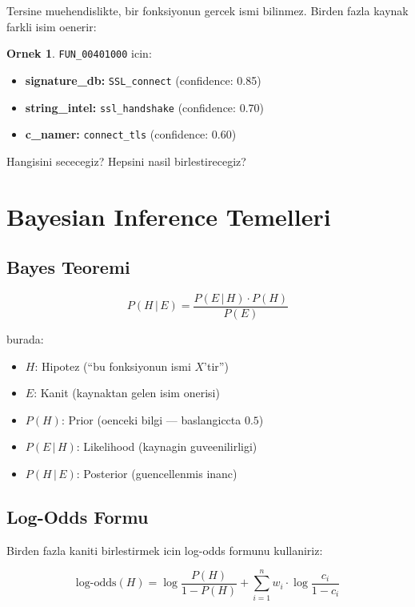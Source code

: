 \documentclass[12pt,a4paper,oneside]{book}
\theoremstyle{definition}
\newtheorem{example}{Ornek}[chapter]
\newcommand{\code}[1]{\texttt{\color{green!60!white}#1}}
\newcommand{\prob}[1]{P\!\left(#1\right)}
\newcommand{\given}{\,|\,}
\begin{document}
Tersine muehendislikte, bir fonksiyonun gercek ismi bilinmez. Birden fazla kaynak farkli isim oenerir:

\begin{example}
\code{FUN\_00401000} icin:
\begin{itemize}
\item \textbf{signature\_db:} \code{SSL\_connect} (confidence: 0.85)
\item \textbf{string\_intel:} \code{ssl\_handshake} (confidence: 0.70)
\item \textbf{c\_namer:} \code{connect\_tls} (confidence: 0.60)
\end{itemize}
Hangisini sececegiz? Hepsini nasil birlestirecegiz?
\end{example}

\section{Bayesian Inference Temelleri}
\label{sec:bayes-temelleri}

\subsection{Bayes Teoremi}

\begin{equation}
\prob{H \given E} = \frac{\prob{E \given H} \cdot \prob{H}}{\prob{E}}
\label{eq:bayes}
\end{equation}

burada:
\begin{itemize}
\item $H$: Hipotez (``bu fonksiyonun ismi $X$'tir'')
\item $E$: Kanit (kaynaktan gelen isim onerisi)
\item $\prob{H}$: Prior (oenceki bilgi --- baslangiccta $0.5$)
\item $\prob{E \given H}$: Likelihood (kaynag\-in guveenilirli\-gi)
\item $\prob{H \given E}$: Posterior (guencellenmis inanc)
\end{itemize}

\subsection{Log-Odds Formu}

Birden fazla kaniti birlestirmek icin log-odds formunu kullaniriz:

\begin{equation}
\boxed{
\text{log-odds}(H) = \log\frac{\prob{H}}{1 - \prob{H}} + \sum_{i=1}^{n} w_i \cdot \log\frac{c_i}{1 - c_i}
}
\label{eq:logodds}
\end{equation}
\end{document}
